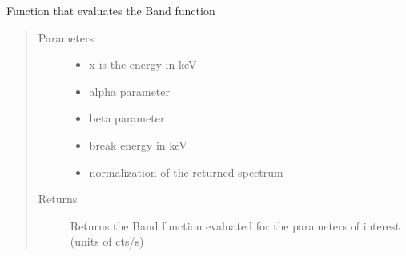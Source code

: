 \documentclass[letterpaper,10pt,english]{sphinxmanual}
\begin{document}
\begin{fulllineitems}
\label{\detokenize{read_process_files:read_process_files.Band}}
Function that evaluates the Band function
\begin{quote}\begin{description}
\item[{Parameters}] \leavevmode\begin{itemize}
\item {} 
 \textendash{} x is the energy in keV

\item {} 
 \textendash{} alpha parameter

\item {} 
 \textendash{} beta parameter

\item {} 
 \textendash{} break energy in keV

\item {} 
 \textendash{} normalization of the returned spectrum

\end{itemize}

\item[{Returns}] \leavevmode
Returns the Band function evaluated for the parameters of interest (units of cts/s)

\end{description}\end{quote}

\end{fulllineitems}

\end{document}
